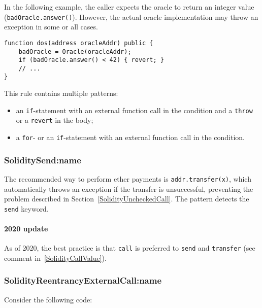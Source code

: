 In the following example, the caller expects the oracle to return an integer value (\texttt{badOracle.answer()}).
 However, the actual oracle implementation may throw an exception in some or all cases.

\begin{lstlisting}[language=Solidity]
function dos(address oracleAddr) public {
	badOracle = Oracle(oracleAddr);
	if (badOracle.answer() < 42) { revert; }
	// ...
}
\end{lstlisting}

This rule contains multiple patterns:
\begin{itemize}
	\item an \texttt{if}-statement with an external function call in the condition and a \texttt{throw} or a \texttt{revert} in the body;
	\item a \texttt{for}- or an \texttt{if}-statement with an external function call in the condition.
\end{itemize}

\subsubsection{\let\letcs\texapiletcs \usevalue SoliditySend:name \let\letcs\etoolboxletcs} \label{SoliditySend}

The recommended way to perform ether payments is \texttt{addr.transfer(x)}, which automatically throws an exception if the transfer is unsuccessful, preventing the problem described in Section~\ref{SolidityUncheckedCall}.
The pattern detects the \texttt{send} keyword.

\paragraph{2020 update}
As of 2020, the best practice is that \texttt{call} is preferred to \texttt{send} and \texttt{transfer} (see comment in~\ref{SolidityCallValue}).

\subsubsection{\let\letcs\texapiletcs \usevalue SolidityReentrancyExternalCall:name \let\letcs\etoolboxletcs} \label{SolidityReentrancyExternalCall}

Consider the following code:

